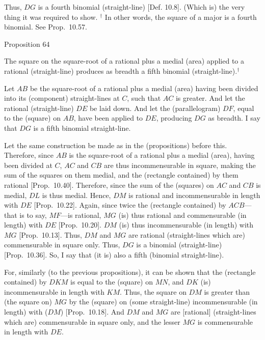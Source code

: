 Thus, $DG$ is a fourth binomial (straight-line) [Def. 10.8]. (Which is) the very thing it was required
to show.
{\footnotesize\noindent$^\dag$ In other words, the square of a major is a
fourth binomial. See Prop.~10.57.}


\begin{center}
{\large Proposition 64}
\end{center}

The square on the square-root of a rational
plus a medial (area) applied to a rational (straight-line) produces as breadth
a fifth binomial (straight-line).$^\dag$

Let $AB$ be the square-root of a rational plus a medial (area) having been divided
into its (component) straight-lines at $C$, such that $AC$ is greater. 
And let the rational (straight-line) $DE$ be laid down. And let the
(parallelogram) $DF$, equal to the (square) on $AB$, have been applied
to $DE$, producing $DG$ as breadth. I say that $DG$ is a fifth
binomial straight-line.

\epsfysize=1.5in 
\centerline{}

Let the same construction  be made as in the (propositions)
before this. Therefore, since $AB$ is the square-root of a
rational plus a medial (area), having been  divided at $C$, $AC$ and $CB$ are thus
incommensurable in square, making the sum of the squares on them
medial, and the (rectangle contained) by them rational [Prop.~10.40]. Therefore, since the
sum of the (squares) on $AC$ and $CB$ is medial, $DL$ is thus
medial. Hence, $DM$ is rational and incommensurable
in length with $DE$ [Prop.~10.22]. Again,
since twice the (rectangle contained) by $ACB$---that is to say,
$MF$---is rational, $MG$ (is) thus rational and commensurable
(in length) with $DE$ [Prop.~10.20]. 
$DM$ (is) thus incommensurable (in length) with $MG$ [Prop.~10.13]. Thus, $DM$ and $MG$
are rational (straight-lines which are) commensurable in square only. Thus,
$DG$ is a binomial (straight-line) [Prop.~10.36].
So, I say that (it is) also a fifth (binomial straight-line).

For, similarly (to the previous propositions), it can be shown that the
(rectangle contained) by $DKM$ is equal to the (square) on $MN$,
and $DK$ (is) incommensurable in length with $KM$. Thus, the
square on $DM$ is greater than (the square on) $MG$ by the (square)
on (some straight-line) incommensurable (in length) with ($DM$)
[Prop.~10.18]. And  $DM$ and $MG$
are [rational] (straight-lines which are) commensurable in square only,
and the lesser $MG$ is commensurable in length with $DE$.


